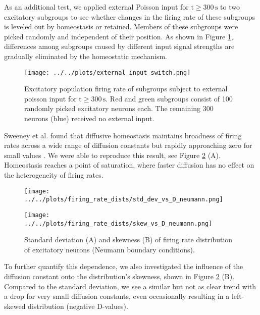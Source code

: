 \documentclass[10pt,a4paper]{article}
\begin{document}
As an additional test, we applied external Poisson input for $\mathrm{t\geq 300\, s}$ to two excitatory subgroups to see whether changes in the firing rate of these subgroups is leveled out by homeostasis or retained. Members of these subgroups were picked randomly and independent of their position. As shown in Figure \ref{Ext_Input_Switch}, differences among subgroups caused by different input signal strengths are gradually eliminated by the homeostatic mechanism.
\begin{figure}
\begin{center}
\texttt{[image: ../../plots/external\_input\_switch.png]}
\end{center}
\caption{Excitatory population firing rate of subgroups subject to external poisson input for $\mathrm{t\geq 300\, s}$. Red and green subgroups consist of 100 randomly picked excitatory neurons each. The remaining 300 neurons (blue) received no external input.}
\label{Ext_Input_Switch}
\end{figure}

Sweeney et al. found that diffusive homeostasis maintains broadness of firing rates across a wide range of diffusion constants but rapidly approaching zero for small values \cite[p. 6]{Sweeney_Paper}. We were able to reproduce this result, see Figure \ref{Fir_Rate_Dist_Width_Skewness_vs_D} (A). Homeostasis reaches a point of saturation, where faster diffusion has no effect on the heterogeneity of firing rates. 
\begin{figure}
\begin{minipage}{0.5\textwidth}
\texttt{[image: ../../plots/firing\_rate\_dists/std\_dev\_vs\_D\_neumann.png]}
\end{minipage}
\begin{minipage}{0.5\textwidth}
\texttt{[image: ../../plots/firing\_rate\_dists/skew\_vs\_D\_neumann.png]}
\end{minipage}
\caption{Standard deviation (A) and skewness (B) of firing rate distribution of excitatory neurons (Neumann boundary conditions).}
\label{Fir_Rate_Dist_Width_Skewness_vs_D}
\end{figure}
To further quantify this dependence, we also investigated the influence of the diffusion constant onto the distribution's skewness, shown in Figure \ref{Fir_Rate_Dist_Width_Skewness_vs_D} (B). Compared to the standard deviation, we see a similar but not as clear trend with a drop for very small diffusion constants, even occasionally resulting in a left-skewed distribution (negative D-values).
\end{document}
